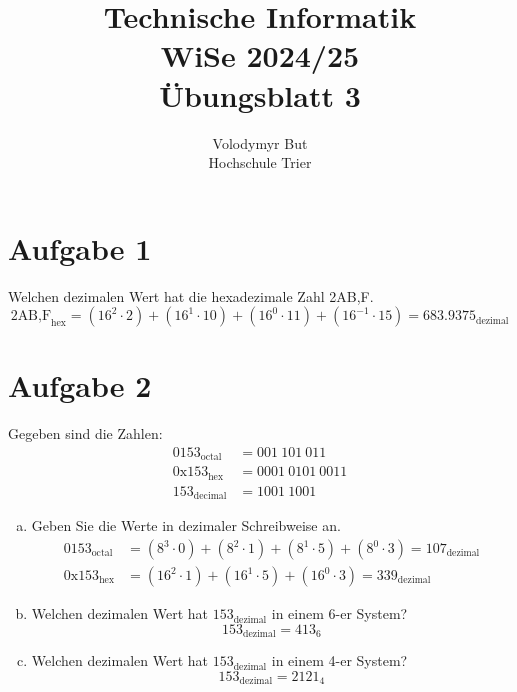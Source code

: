 \documentclass[10pt, oneside]{article}
\title{Technische Informatik\\[10pt]\Large{WiSe 2024/25}\\[15pt]\Large{{\"U}bungsblatt 3}}
\author{Volodymyr But\\[10pt]Hochschule Trier}
\date{}
\begin{document}
\sloppy

\maketitle
\vspace{25px}

\section{Aufgabe 1}

Welchen dezimalen Wert hat die hexadezimale Zahl 2AB,F.
\begin{equation*}
    2\text{AB,F}_{\text{hex}} = (16^2 \cdot 2) + (16^1 \cdot 10) + (16^0 \cdot
    11) + (16^{-1} \cdot 15) = 683.9375_{\text{dezimal}}
\end{equation*}

\section{Aufgabe 2}

Gegeben sind die Zahlen:
\begin{align*}
    0153_{\text{octal}} &= 001\ 101\ 011 \\[5pt]
    0\text{x}153_{\text{hex}}  &= 0001\ 0101\ 0011 \\[5pt]
    153_{\text{decimal}} &= 1001\ 1001
\end{align*}
\begin{enumerate}[(a)]
    \item Geben Sie die Werte in dezimaler Schreibweise an.
        \begin{align*}
            0153_{\text{octal}} &= (8^3 \cdot 0) + (8^2 \cdot 1) + (8^1 \cdot
            5) + (8^0 \cdot 3) = 107_{\text{dezimal}} \\[5pt]
            0\text{x}153_{\text{hex}} &= (16^2 \cdot 1) + (16^1 \cdot 5) +
            (16^0 \cdot 3) = 339_{\text{dezimal}}
        \end{align*}
    \item Welchen dezimalen Wert hat $153_{\text{dezimal}}$ in einem 6-er System?
        \begin{equation*}
            153_{\text{dezimal}} = 413_{6}
        \end{equation*}
    \item Welchen dezimalen Wert hat $153_{\text{dezimal}}$ in einem 4-er System?
        \begin{equation*}
            153_{\text{dezimal}} = 2121_{4}
        \end{equation*}
\end{enumerate}
\end{document}
